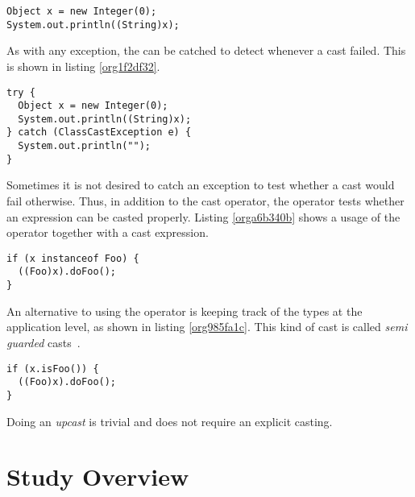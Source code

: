 \begin{lstlisting}
Object x = new Integer(0); 
System.out.println((String)x); 
\end{lstlisting}

As with any exception, the \cce{} can be catched to detect whenever a cast failed. 
This is shown in listing \ref{org1f2df32}. 

\begin{lstlisting}
try { 
  Object x = new Integer(0); 
  System.out.println((String)x); 
} catch (ClassCastException e) { 
  System.out.println(""); 
} 
\end{lstlisting}

Sometimes it is not desired to catch an exception to test whether a cast would fail otherwise. 
Thus, in addition to the cast operator, the \instanceof{} operator tests whether an expression can be casted properly. 
Listing \ref{orga6b340b} shows a usage of the \instanceof{} operator together with a cast expression. 

\begin{lstlisting}
if (x instanceof Foo) { 
  ((Foo)x).doFoo(); 
} 
\end{lstlisting}

An alternative to using the \instanceof{} operator is keeping track of the 
types at the application level, as shown in listing \ref{org985fa1c}. 
This kind of cast is called \emph{semi guarded} casts~\cite{winther_guarded_2011}. 

\begin{lstlisting}
if (x.isFoo()) { 
  ((Foo)x).doFoo(); 
} 
\end{lstlisting}

Doing an \emph{upcast} is trivial and does not require an explicit casting. 

\section{Study Overview \label{org8065fcf}}
\label{sec:orga9e9ff5}

